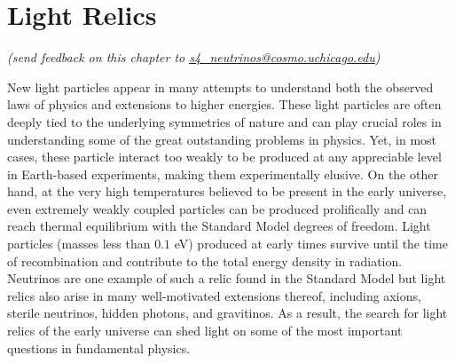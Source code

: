  
\chapter{Light Relics}


\def\beq{\begin{equation}}
\def\eeq{\end{equation}}

\def\bea{\begin{eqnarray}}
\def\eea{\end{eqnarray}}

\def\Neff{N_{\rm eff}}
\def\Nf{N_{\rm eff}}
\def\gs{g_{\star}}
\def\Mpl{M_{\rm pl}}


\def\gtrsim{\raise-.75ex\hbox{$\buildrel>\over\sim$}}
\def\lsim{\raise-.75ex\hbox{$\buildrel<\over\sim$}}

\begin{center}
{\small \it (send feedback on this chapter to \href{mailto:s4_neutrinos@cosmo.uchicago.edu}{s4\_neutrinos@cosmo.uchicago.edu})}
\end{center}

New light particles appear in many attempts to understand both the observed laws of physics and extensions to higher energies.  These light particles are often deeply tied to the underlying symmetries of nature and can play crucial roles in understanding some of the great outstanding problems in physics.  Yet, in most cases, these particle interact too weakly to be produced at any appreciable level in Earth-based experiments, making them experimentally elusive.  On the other hand, at the very high temperatures believed to be present in the early universe, even extremely weakly coupled particles can be produced prolifically and can reach thermal equilibrium with the Standard Model degrees of freedom.  Light particles (masses less than $0.1$ eV) produced at early times survive until the time of recombination and contribute to the total energy density in radiation.  Neutrinos are one example of such a relic found in the Standard Model but light relics also arise in many well-motivated extensions thereof, including axions, sterile neutrinos, hidden photons, and gravitinos.  As a result, the search for light relics of the early universe can shed light on some of the most important questions in fundamental physics.
 

